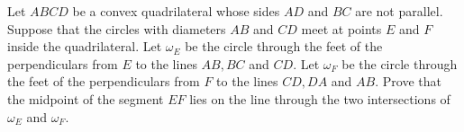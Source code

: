 Let 
$ABCD$
 be a convex quadrilateral whose sides 
$AD$
 and 
$BC$
 are not parallel. Suppose that the circles with diameters 
$AB$
 and 
$CD$
 meet at points 
$E$
 and 
$F$
 inside the quadrilateral. Let 
$\omega_E$
 be the circle through the feet of the perpendiculars from 
$E$
 to the lines 
$AB,BC$
 and 
$CD$.
 Let 
$\omega_F$
 be the circle through  the feet of the perpendiculars from 
$F$
 to the lines 
$CD,DA$
 and 
$AB$.
 Prove that the midpoint of the segment 
$EF$
 lies on the line through the two intersections of 
$\omega_E$
 and 
$\omega_F$.
